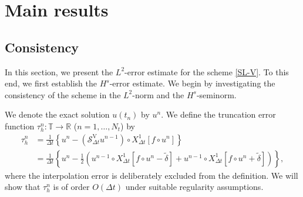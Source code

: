 \documentclass[10pt,a4paper,tbtags,leqno]{amsart}
\theoremstyle{definition}
\numberwithin{equation}{section}
\begin{document}
\section{Main results} 
\label{s:3} 

\subsection{Consistency} 

In this section, we present the $ L^2 $-error estimate for the scheme \eqref{SL-V}. To this end, we first establish the $H^s$-error estimate. We begin by investigating the consistency of the scheme in the $ L^2 $-norm and the $ H^s $-seminorm. 

We denote the exact solution $ u (t_n) $ by $ u^n $. We define the truncation error function $ \tau_h^n: \mathbb{T} \to \mathbb{R} $ ($ n = 1, \ldots, N_t $) by 
\begin{align} 
  \tau_h^n & = \frac{1}{\Delta t} \left\{u^n - (\mathcal{S}_{\Delta t}^{\mathrm{V}} u^{n - 1}) \circ {X_{\Delta t}^1} [f \circ u^n]\right\} \\ 
  & = \frac{1}{\Delta t} \left\{u^n - \frac{1}{2} ( u^{n - 1} \circ {X_{\Delta t}^1} [f \circ u^n - \tilde{\delta}] + u^{n - 1} \circ {X_{\Delta t}^1} [f \circ u^n + \tilde{\delta}]) \right\}, \label{def_tau} 
\end{align} 
where the interpolation error is deliberately excluded from the definition. We will show that $ \tau_h^n $ is of order $ O(\Delta t) $ under suitable regularity assumptions. 
\end{document}
